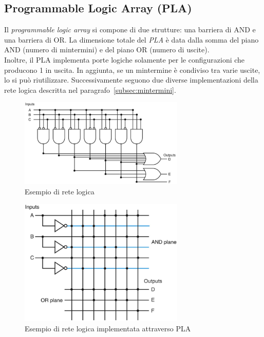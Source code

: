 \documentclass[class=book, crop=false]{standalone}
\begin{document}
\subsection*{Programmable Logic Array (PLA)}
\label{subsec:pla}
Il \emph{programmable logic array} si compone di due strutture: una barriera di AND e una barriera di OR. La dimensione totale del \emph{PLA} è data dalla somma del piano AND (numero di mintermini) e del piano OR (numero di uscite).\\
Inoltre, il PLA implementa porte logiche solamente per le configurazioni che producono 1 in uscita. In aggiunta, se un mintermine è condiviso tra varie uscite, lo si può riutilizzare.
Successivamente seguono due diverse implementazioni della rete logica descritta nel paragrafo~\ref{subsec:mintermini}.
\begin{figure}[H]
	\centering
	\includegraphics[width=0.7\textwidth,keepaspectratio]{es_rete_logica.png}
	\caption{Esempio di rete logica}
\end{figure}
\begin{figure}[H]
	\centering
	\includegraphics[width=0.7\textwidth,keepaspectratio]{es_pla.png}
	\caption{Esempio di rete logica implementata attraverso PLA}
\end{figure}
\end{document}
